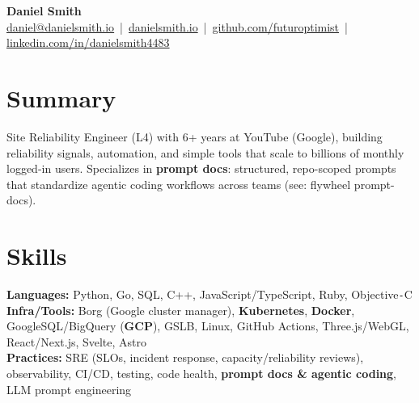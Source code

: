 \documentclass[10pt]{article}
\begin{document}
\begin{center}
    {\LARGE \textbf{Daniel Smith}}\\[-1mm]
    \href{mailto:daniel@danielsmith.io}{daniel@danielsmith.io} \,|\, 
    \href{https://danielsmith.io}{danielsmith.io} \,|\, 
    \href{https://github.com/futuroptimist}{github.com/futuroptimist} \,|\, 
    \href{https://linkedin.com/in/danielsmith4483}{linkedin.com/in/danielsmith4483}
\end{center}

\vspace{-2mm}
\section*{Summary}
Site Reliability Engineer (L4) with 6+ years at YouTube (Google), building reliability signals, automation, and simple tools that scale to billions of monthly logged-in users. Specializes in \textbf{prompt docs}: structured, repo-scoped prompts that standardize agentic coding workflows across teams (see: flywheel prompt-docs).

\vspace{-2mm}
\section*{Skills}
\textbf{Languages:} Python, Go, SQL, C++, JavaScript/TypeScript, Ruby, Objective\texttt{-}C \\
\textbf{Infra/Tools:} Borg (Google cluster manager), \textbf{Kubernetes}, \textbf{Docker}, GoogleSQL/BigQuery (\textbf{GCP}), GSLB, Linux, GitHub Actions, Three.js/WebGL, React/Next.js, Svelte, Astro \\
\textbf{Practices:} SRE (SLOs, incident response, capacity/reliability reviews), observability, CI/CD, testing, code health, \textbf{prompt docs \& agentic coding}, LLM prompt engineering

\vspace{-2mm}
\end{document}
